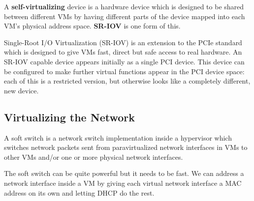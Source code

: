A \textbf{self-virtualizing} device is a hardware device which is designed to be shared between different VMs by having different parts of the device mapped into each VM’s physical address space. \textbf{SR-IOV} is one form of this. \medskip

Single-Root I/O Virtualization (SR-IOV) is an extension to the PCIe standard which is designed to give VMs fast, direct but safe access to real hardware. An SR-IOV capable device appears initially as a single PCI device. This device can be configured to make further virtual functions appear in the PCI device space: each of this is a restricted version, but otherwise looks like a completely different, new device.


\subsection{Virtualizing the Network}

A soft switch is a network switch implementation inside a hypervisor which switches network packets sent from paravirtualized network interfaces in VMs to other VMs and/or one or more physical network interfaces.\medskip

The soft switch can be quite powerful but it needs to be fast. We can address a network interface inside a VM by giving each virtual network interface a MAC address on its own and letting DHCP do the rest.
